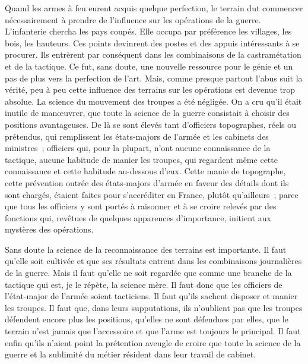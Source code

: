 \documentclass[french,twoside]{book} %
\begin{document}
Quand les armes à feu eurent acquis quelque perfection, le terrain dut commencer nécessairement à prendre de l’influence sur les opérations de la guerre. L’infanterie chercha les pays coupés. Elle occupa par préférence les villages, les bois, les hauteurs. Ces points devinrent des postes et des appuis intéressants à se procurer. Ils entrèrent par conséquent dans les combinaisons de la castramétation et de la tactique. Ce fut, sans doute, une nouvelle ressource pour le génie et un pas de plus vers la perfection de l’art. Mais, comme presque partout l’abus suit la vérité, peu à peu cette influence des terrains sur les opérations est devenue trop absolue. La science du mouvement des troupes a été négligée. On a cru qu’il était inutile de manœuvrer, que toute la science de la guerre consistait à choisir des positions avantageuses. De là se sont élevés tant d’officiers topographes, réels ou prétendus, qui remplissent les états-majors de l’armée et les cabinets des ministres ; officiers qui, pour la plupart, n’ont aucune connaissance de la tactique, aucune habitude de manier les troupes, qui regardent même cette connaissance et cette habitude au-dessous d’eux. Cette manie de topographe, cette prévention outrée des états-majors d’armée en faveur des détails dont ils sont chargés, étaient faites pour s’accréditer en France, plutôt qu’ailleurs ; parce que tous les officiers y sont portés à raisonner et à se croire relevés par des fonctions qui, revêtues de quelques apparences d’importance, initient aux mystères des opérations.\par
Sans doute la science de la reconnaissance des terrains est importante. Il faut qu’elle soit cultivée et que ses résultats entrent dans les combinaisons journalières de la guerre. Mais il faut qu’elle ne soit regardée que comme une branche de la tactique qui est, je le répète, la science mère. Il faut donc que les officiers de l’état-major de l’armée soient tacticiens. Il faut qu’ils sachent disposer et manier les troupes. Il faut que, dans leurs supputations, ils n’oublient pas que les troupes défendent encore plus les positions, qu’elles ne sont défendues par elles, que le terrain n’est jamais que l’accessoire et que l’arme est toujours le principal. Il faut enfin qu’ils n’aient point la prétention aveugle de croire que toute la science de la guerre et la sublimité du métier résident dans leur travail de cabinet.\par
\end{document}
